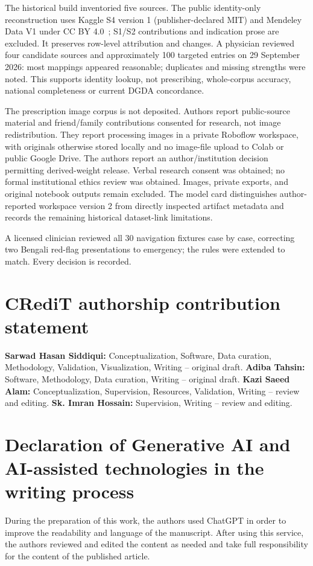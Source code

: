 \documentclass[preprint,12pt,a4paper]{elsarticle}
\begin{document}
The historical build inventoried five sources. The public identity-only reconstruction uses
Kaggle S4 version 1 (publisher-declared MIT) and Mendeley Data V1 under CC BY 4.0~\cite{bdmeds};
S1/S2 contributions and indication prose are excluded. It preserves row-level attribution
and changes. A physician reviewed four candidate sources and approximately
100 targeted entries on 29 September 2026: most mappings appeared reasonable; duplicates
and missing strengths were noted. This supports identity lookup, not prescribing,
whole-corpus accuracy, national completeness or current DGDA concordance.

The prescription image corpus is not deposited. Authors report public-source material
and friend/family contributions consented for research, not image redistribution.
They report processing images in a private Roboflow workspace, with originals otherwise
stored locally and no image-file upload to Colab or public Google Drive.
The authors report an author/institution decision permitting derived-weight release.
Verbal research consent was obtained; no formal institutional ethics review was obtained.
Images, private exports, and original notebook outputs remain excluded.
The model card distinguishes author-reported workspace version 2 from directly inspected
artifact metadata and records the remaining historical dataset-link limitations.

A licensed clinician reviewed all 30 navigation fixtures case by case, correcting two
Bengali red-flag presentations to emergency; the rules were extended to match. Every
decision is recorded.

\section*{CRediT authorship contribution statement}
\textbf{Sarwad Hasan Siddiqui:} Conceptualization,  Software, Data curation, Methodology, Validation, Visualization, Writing -- original draft. \textbf{Adiba Tahsin:} Software, Methodology, Data curation, Writing -- original draft. \textbf{Kazi Saeed Alam:} Conceptualization, Supervision, Resources, Validation, Writing -- review and editing. \textbf{Sk. Imran Hossain:} Supervision, Writing -- review and editing.

\section*{Declaration of Generative AI and AI-assisted technologies in the writing process}
During the preparation of this work, the authors used ChatGPT in order to improve the readability and language of the manuscript. After using this service, the authors reviewed and edited the content as needed and take full responsibility for the content of the published article.
\end{document}
